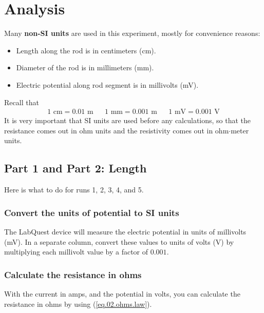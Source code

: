 \section{Analysis}
Many \textbf{non-SI units} are used in this experiment, mostly for convenience reasons:
\begin{itemize}
	\item Length along the rod is in centimeters (cm).
	\item Diameter of the rod is in millimeters (mm).
	\item Electric potential along rod segment is in millivolts (mV).
\end{itemize}
Recall that
\begin{align}
	1 \text{ cm} = 0.01 \text{ m} && 1 \text{ mm} = 0.001 \text{ m} && 1 \text{ mV} = 0.001 \text{ V}
\end{align}
It is very important that SI units are used before any calculations, so that the resistance comes out in ohm units and the resistivity comes out in ohm$\cdot$meter units.
\subsection{Part 1 and Part 2: Length}
Here is what to do for runs 1, 2, 3, 4, and 5.
\subsubsection{Convert the units of potential to SI units}
The LabQuest device will measure the electric potential in units of millivolts (mV). In a separate column, convert these values to units of volts (V) by multiplying each millivolt value by a factor of $0.001$.
\subsubsection{Calculate the resistance in ohms}
With the current in amps, and the potential in volts, you can calculate the resistance in ohms by using (\ref{eq.02.ohms.law}).
